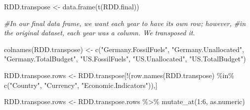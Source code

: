 \documentclass[
  12pt,
]{article}
\newenvironment{Shaded}{\begin{snugshade}}{\end{snugshade}}
\newcommand{\CommentTok}[1]{\textcolor[rgb]{0.56,0.35,0.01}{\textit{#1}}}
\newcommand{\DecValTok}[1]{\textcolor[rgb]{0.00,0.00,0.81}{#1}}
\newcommand{\FunctionTok}[1]{\textcolor[rgb]{0.00,0.00,0.00}{#1}}
\newcommand{\NormalTok}[1]{#1}
\newcommand{\OtherTok}[1]{\textcolor[rgb]{0.56,0.35,0.01}{#1}}
\newcommand{\SpecialCharTok}[1]{\textcolor[rgb]{0.00,0.00,0.00}{#1}}
\newcommand{\StringTok}[1]{\textcolor[rgb]{0.31,0.60,0.02}{#1}}
\begin{document}
\begin{Shaded}
\begin{Highlighting}[]
\NormalTok{RDD.transpose }\OtherTok{\textless{}{-}} \FunctionTok{data.frame}\NormalTok{(}\FunctionTok{t}\NormalTok{(RDD.final))}

\CommentTok{\#In our final data frame, we want each year to have its own row; however, }
\CommentTok{\#in the original dataset, each year was a column. We transposed it.}

\FunctionTok{colnames}\NormalTok{(RDD.transpose) }\OtherTok{\textless{}{-}} \FunctionTok{c}\NormalTok{(}\StringTok{"Germany.FossilFuels"}\NormalTok{, }\StringTok{"Germany.Unallocated"}\NormalTok{, }\StringTok{"Germany.TotalBudget"}\NormalTok{, }\StringTok{"US.FossilFuels"}\NormalTok{, }\StringTok{"US.Unallocated"}\NormalTok{, }\StringTok{"US.TotalBudget"}\NormalTok{)}

\NormalTok{RDD.transpose.rows }\OtherTok{\textless{}{-}}\NormalTok{ RDD.transpose[}\SpecialCharTok{!}\NormalTok{(}\FunctionTok{row.names}\NormalTok{(RDD.transpose) }\SpecialCharTok{\%in\%} \FunctionTok{c}\NormalTok{(}\StringTok{"Country"}\NormalTok{, }\StringTok{"Currency"}\NormalTok{, }\StringTok{"Economic.Indicators"}\NormalTok{)),]}

 
\NormalTok{RDD.transpose.rows }\OtherTok{\textless{}{-}}\NormalTok{ RDD.transpose.rows }\SpecialCharTok{\%\textgreater{}\%}
  \FunctionTok{mutate\_at}\NormalTok{(}\DecValTok{1}\SpecialCharTok{:}\DecValTok{6}\NormalTok{, as.numeric)}


\end{Highlighting}
\end{Shaded}
\end{document}
